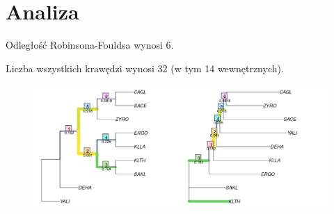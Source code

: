 \documentclass[12pt]{article}
\begin{document}
\section{Analiza}
Odległość Robinsona-Fouldsa wynosi 6.

Liczba wszystkich krawędzi wynosi 32 (w tym 14 wewnętrznych).

\begin{figure}[H]
\begin{center}
\includegraphics[width=\textwidth]{diff}
\end{center}
\end{figure}
\end{document}
